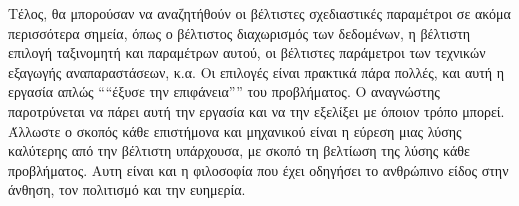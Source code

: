 Τέλος,  θα μπορούσαν να αναζητήθούν οι βέλτιστες σχεδιαστικές παραμέτροι σε ακόμα περισσότερα
σημεία, όπως ο βέλτιστος διαχωρισμός των δεδομένων, η βέλτιστη επιλογή ταξινομητή και παραμέτρων αυτού,
οι βέλτιστες παράμετροι των τεχνικών εξαγωγής αναπαραστάσεων, κ.α. Οι επιλογές είναι πρακτικά πάρα πολλές, 
και αυτή η εργασία απλώς ````έξυσε την επιφάνεια'''' του προβλήματος. Ο αναγνώστης παροτρύνεται να πάρει 
αυτή την εργασία και να την εξελίξει με όποιον τρόπο μπορεί. Άλλωστε ο σκοπός κάθε επιστήμονα και 
μηχανικού είναι η εύρεση μιας λύσης καλύτερης από την βέλτιστη υπάρχουσα, με σκοπό τη βελτίωση της λύσης
κάθε προβλήματος. Αυτη είναι και η φιλοσοφία που έχει οδηγήσει το ανθρώπινο είδος στην άνθηση, τον
πολιτισμό και την ευημερία.